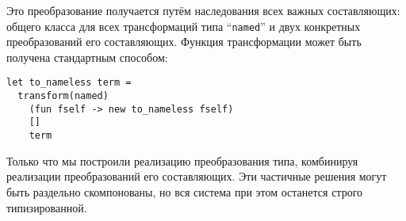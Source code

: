 Это преобразование получается путём наследования всех важных составляющих: общего класса для всех трансформаций типа ``\lstinline{named}'' 
и двух конкретных преобразований его составляющих. Функция трансформации может быть получена стандартным способом:

\begin{lstlisting}
let to_nameless term =
  transform(named) 
    (fun fself -> new to_nameless fself) 
    [] 
    term
\end{lstlisting}

Только что мы построили реализацию преобразования типа, комбинируя реализации преобразований его составляющих. Эти частичные решения могут быть раздельно скомпонованы, но вся система при этом останется строго типизированной.

\begin{comment}

\subsection{Пример пользовательского плагина}
\label{pluginExample}

Наконец, мы продемонстрируем использование системы плагинов на свежем примере реализации плагина. Для этой цели мы выбрали широко известное преобразование \emph{hash-consing}~\cite{HC}. Это преобразование превращает структуры данных в их максимально компактное представление в памяти, при котором структурно равные части представляются в памяти как один физический объект. Например, синтаксическое дерево выражения

\begin{lstlisting}
let t =
  Binop ("+",
    Binop ("-",
      Var "b",
      Binop ("*", Var "b", Var "a")),
    Binop ("*", Var "b", Var "a"))
\end{lstlisting}
может быть переписано  как

\begin{lstlisting}
let t =
  let b  = Var "b" in
  let ba = Binop ("*", b, Var "a") in
  Binop ("+", Binop ("-", b, ba), ba)  
\end{lstlisting}
где равные подвыражения представляются как равные поддеревья.
 
Наш плагин по типу  ``\lstinline|$\left\{\alpha_i\right\}$ t|'' предоставит функцию для 
hash-consing ``\lstinline{hc(t)}'' с сигнатурой 

\begin{lstlisting}
$\{$ H.t -> $\alpha_i$ -> H.t * $\alpha_i$ $\}$ -> H.t -> $\left\{\alpha_i\right\}$ t -> H.t * $\left\{\alpha_i\right\}$ t
\end{lstlisting}
где ``\lstinline{H.t}''~--- это гетерогенная хэш таблица для произвольных типов. Интерфейс у неё следующий:


\end{comment}
